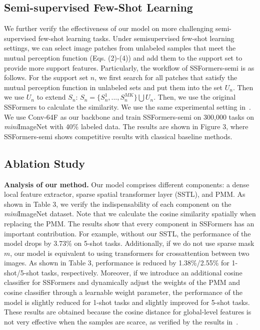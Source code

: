 \documentclass{SCIS2019}
\begin{document}
\subsection{Semi-supervised Few-Shot Learning}
We further verify the effectiveness of our model on more challenging semi-supervised few-shot learning tasks.
Under semisupervised few-shot learning settings, we can select image patches from unlabeled samples that meet the mutual perception function (Eqs. (2)-(4)) and add them to the support set to provide more support features. Particularly, the workflow of SSFormers-semi is as follows. For the support set $n$, we first search for all patches that satisfy the mutual perception function in unlabeled sets and put them into the set $U_n$. Then we use $U_n$ to extend $S_n$:
$S_n = \{S_n^1,...,S_n^{MK}\}\bigcup U_n$. Then, we use the original SSFormers to calculate the similarity.
\label{key}
We use the same experimental setting in~\cite{32}. We use Conv-64F as our backbone and train SSFormers-semi on 300,000 tasks on \emph{mini}ImageNet with 40\% labeled data. The results are shown in Figure 3, where SSFormers-semi shows competitive results with classical baseline methods.

\subsection{Ablation Study}
\textbf{Analysis of our method.}
Our model comprises different components: a dense local feature extractor, sparse spatial transformer layer (SSTL), and PMM. As shown in Table 3, we verify the indispensability of each component on the \emph{mini}ImageNet dataset. Note that we calculate the cosine similarity spatially when replacing the PMM. The results show that every component in SSFormers has an important contribution. For example, without our SSTL, the performance of the model drops by 3.73\% on 5-shot tasks. Additionally, if we do not use sparse mask $m$, our model is equivalent to using transformers for crossattention between two images. As shown in Table 3, performance is reduced by 1.38\%/2.55\% for 1-shot/5-shot tasks, respectively. Moreover, if we introduce an additional cosine classifier for SSFormers and dynamically adjust the weights of the PMM and cosine classifier through a learnable weight parameter, the performance of the model is slightly reduced for 1-shot tasks and slightly improved for 5-shot tasks. These results are obtained because the cosine distance for global-level features is not very effective when the samples are scarce, as verified by the results in~\cite{7,44}.
\end{document}
